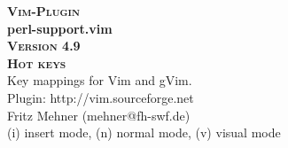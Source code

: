 \documentclass[oneside,10pt,landscape,DIV17]{scrartcl}
\newcommand{\Pluginversion}{4.9}
\begin{document}
%

\begin{multicols}{3}
%
\begin{center}
%
\textbf{\textsc{\small{Vim-Plugin}}}\\
\textbf{\LARGE{perl-support.vim}}\\
\textbf{\textsc{\small{Version \Pluginversion}}}\\
\vspace{5mm}%
\textbf{\textsc{\Huge{Hot keys}}}\\ 
\vspace{5mm}%
Key mappings for Vim and gVim.\\
Plugin: http://vim.sourceforge.net\\
Fritz Mehner (mehner@fh-swf.de)\\
\vspace{1.0mm}
{\normalsize (i)} insert mode, {\normalsize (n)} normal mode, {\normalsize (v)} visual mode\\
\vspace{4.0mm}


\end{center}
\end{multicols}
\end{document}
